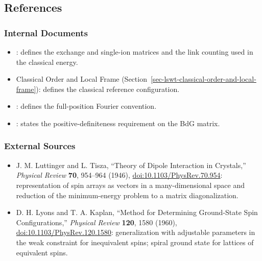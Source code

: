\subsection{References}

\subsubsection{Internal Documents}

\begin{itemize}
\tightlist
\item
  : defines the exchange and single-ion matrices and the link counting used in the classical energy.
\item
  Classical Order and Local Frame (Section~\ref{sec-lswt-classical-order-and-local-frame}): defines the classical reference configuration.
\item
  : defines the full-position Fourier convention.
\item
  : states the positive-definiteness requirement on the BdG matrix.
\end{itemize}

\subsubsection{External Sources}

\begin{itemize}
\tightlist
\item
  J. M. Luttinger and L. Tisza, ``Theory of Dipole Interaction in Crystals,'' \emph{Physical Review} \textbf{70}, 954--964 (1946), \href{https://doi.org/10.1103/PhysRev.70.954}{doi:10.1103/PhysRev.70.954}: representation of spin arrays as vectors in a many-dimensional space and reduction of the minimum-energy problem to a matrix diagonalization.
\item
  D. H. Lyons and T. A. Kaplan, ``Method for Determining Ground-State Spin Configurations,'' \emph{Physical Review} \textbf{120}, 1580 (1960), \href{https://doi.org/10.1103/PhysRev.120.1580}{doi:10.1103/PhysRev.120.1580}: generalization with adjustable parameters in the weak constraint for inequivalent spins; spiral ground state for lattices of equivalent spins.
\end{itemize}
